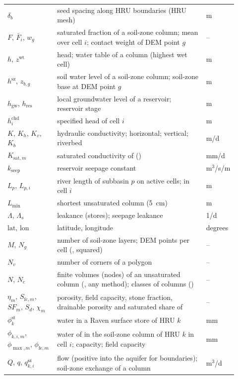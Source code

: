 \begin{longtable}{P{0.2\linewidth}P{0.6\linewidth}P{0.12\linewidth}}
$\delta_b$ & seed spacing along HRU boundaries (HRU mesh) & m\\
$F$, $\bar F_i$, $w_g$ & saturated fraction of a soil-zone column; mean over cell $i$; contact weight of DEM point $g$ & --\\
$h$, $z^{\mathrm{wt}}$ & head; water table of a column (highest wet cell) & m\\
$h^{\mathrm{sz}}$, $z_{b,g}$ & soil water level of a soil-zone column; soil-zone base at DEM point $g$ & m\\
$h_{\mathrm{gw}}$, $h_{\mathrm{res}}$ & local groundwater level of a reservoir; reservoir stage & m\\
$h^{\mathrm{chd}}_i$ & specified head of cell $i$ & m\\
$K$, $K_h$, $K_v$, $K_b$ & hydraulic conductivity; horizontal; vertical; riverbed & m/d\\
$K_{\mathrm{sat},m}$ & saturated conductivity of  () & mm/d\\
$k_{\mathrm{seep}}$ & reservoir seepage constant & m$^3$/s/m\\
$L_p$, $L_{p,i}$ & river length of subbasin $p$ on active cells; in cell $i$ & m\\
$L_{\min}$ & shortest unsaturated column (5~cm) & m\\
$\Lambda$, $\Lambda_s$ & leakance (stores); seepage leakance & 1/d\\
$\mathrm{lat}$, $\mathrm{lon}$ & latitude, longitude & degrees\\
$M$, $N_g$ & number of soil-zone layers; DEM points per cell (, squared) & --\\
$N_v$ & number of corners of a polygon & --\\
$N$, $N_c$ & finite volumes (nodes) of an unsaturated column (, any method); classes of columns () & --\\
$\eta_m$, $S_{\mathrm{fc},m}$, $\mathit{SF}_m$, $S_d$, $\chi_m$ & porosity, field capacity, stone fraction, drainable porosity and saturated share of  & --\\
$\phi^{\mathrm{st}}_k$ & water in a Raven surface store of HRU $k$ & mm\\
$\phi_{k,i,m}$, $\phi_{\max,m}$, $\phi_{\mathrm{fc},m}$ & water of  in the soil-zone column of HRU $k$ in cell $i$; capacity; field capacity & mm\\
$Q$, $q$, $q^{\mathrm{sz}}_{k,i}$ & flow (positive into the aquifer for boundaries); soil-zone exchange of a column & m$^3$/d\\

\end{longtable}

